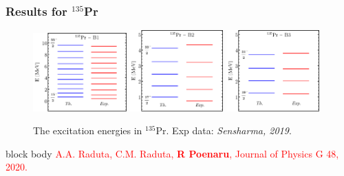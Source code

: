 \documentclass{beamer}
\begin{document}
\begin{frame}
	\frametitle{Results for $^{135}$Pr}
	\begin{figure}
		\centering
		\includegraphics[width=0.32\textwidth]{figures/new-boson/135Pr-New-Boson-Band1-Energies.pdf}
		\includegraphics[width=0.32\textwidth]{figures/new-boson/135Pr-New-Boson-Band2-Energies.pdf}
		\includegraphics[width=0.32\textwidth]{figures/new-boson/135Pr-New-Boson-Band3-Energies.pdf}
		\caption{The excitation energies in $^{135}$Pr. Exp data: \textit{Sensharma, 2019}.}
	\end{figure}
	\begin{table}
		\centering
	\end{table}
	\begin{beamercolorbox}[rounded=true,shadow=false, wd=\linewidth,]{block body}
		\centering
		\textcolor{red}{\footnotesize{A.A. Raduta, C.M. Raduta, \textbf{R Poenaru}, Journal of Physics G 48, 2020.}}
	\end{beamercolorbox}
\end{frame}
\end{document}
